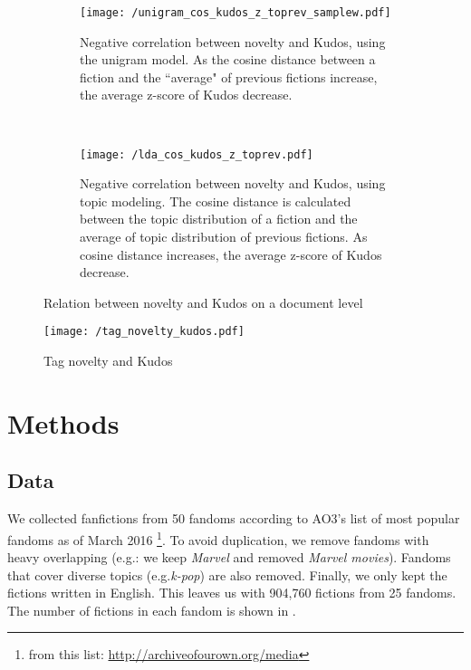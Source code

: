 \documentclass[a4paper]{article}
\begin{document}
\begin{figure}
    \centering
    \begin{subfigure}[b]{0.4\textwidth}
        \texttt{[image: /unigram\_cos\_kudos\_z\_toprev\_samplew.pdf]}
        \caption{Negative correlation between novelty and Kudos, using the unigram model. As the cosine distance between a fiction and the ``average" of previous fictions increase, the average z-score of Kudos decrease.}
        \label{fig:unigram_cos}
    \end{subfigure}
    ~ %
    \begin{subfigure}[b]{0.4\textwidth}
        \texttt{[image: /lda\_cos\_kudos\_z\_toprev.pdf]}
        \caption{Negative correlation between novelty and Kudos, using topic modeling. The cosine distance is calculated between the topic distribution of a fiction and the average of topic distribution of previous fictions. As cosine distance increases, the average z-score of Kudos decrease.}
        \label{fig:lda_cos}
    \end{subfigure}
    \caption{Relation between novelty and Kudos on a document level}\label{fig:novelty_kudos_doc}
\end{figure}

\begin{figure}[htbp]
\begin{center}
\texttt{[image: /tag\_novelty\_kudos.pdf]}
\caption{Tag novelty and Kudos}
\label{fig:tag_novelty}
\end{center}
\end{figure}

\section{Methods} %
\label{sec:methods}


\subsection{Data}
We collected fanfictions from 50 fandoms according to AO3's list of most popular fandoms as of March 2016 \footnote{from this list: \url{http://archiveofourown.org/media}}. To avoid duplication, we remove fandoms with heavy overlapping (e.g.: we keep \emph{Marvel} and removed \emph{Marvel movies}). Fandoms that cover diverse topics (e.g.\emph{k-pop}) are also removed. Finally, we only kept the fictions written in English. This leaves us with 904,760 fictions from 25 fandoms. The number of fictions in each fandom is shown in .
\end{document}
